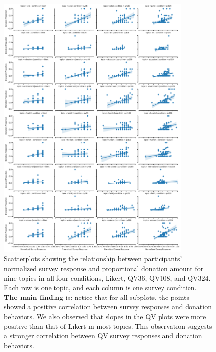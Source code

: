 \begin{figure}[htpb]
    \centering
    \includegraphics[width=0.85\textwidth, keepaspectratio=true]{content/image/vote_donation_covariates.pdf}
    \caption{
      Scatterplots showing the relationship between participants' normalized survey response and proportional donation amount for nine topics in all four conditions, Likert, QV36, QV108, and QV324. Each row is one topic, and each column is one survey condition. \textbf{The main finding} is: notice that for all subplots, the points showed a positive correlation between survey responses and donation behaviors. We also observed that slopes in the QV plots were more positive than that of Likert in most topics. This observation suggests a stronger correlation between QV survey responses and donation behaviors.
    }
    \label{fig:topic_covariate_exp1}
\end{figure}



